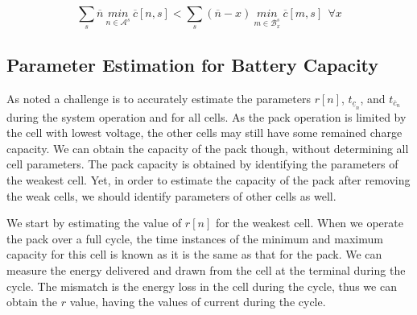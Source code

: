 \documentclass[10pt,twocolumn]{IEEEtran}
\begin{document}
\begin{equation}
\sum_{s} \overline{n} \  \underset{n\in \mathcal{A}^s}{min} \ \overline c[n,s] <  \sum_{s}(\overline{n}-x) \ \underset{m\in \mathcal{B}^{s}_x}{min} \ \overline c[m,s] \ \  \forall x
\label{eq:removecellineq}
\end{equation}

\subsection{Parameter Estimation for Battery Capacity} \label{sec:parameter_estimation}

As noted a challenge is to accurately estimate the parameters  $r[n]$, $t_{\underline{c}_n} $,  and $t_{\overline{c}_n} $  during the system operation and for all cells.%
 As the pack operation is limited by the cell with lowest voltage, the other cells may still have some remained charge capacity.%
We can obtain the capacity of the pack though, without determining all cell parameters. 
The pack capacity is obtained by identifying the parameters of the weakest cell.
Yet, in order to estimate the capacity of the pack after removing the weak cells, we should identify parameters of other cells as well.

We start by estimating the value of $r[n]$ for the weakest cell. 
When we operate the pack over a full cycle, the time instances of the  minimum and maximum capacity for this cell is known as it is the same as that for the pack.
We can  measure the energy delivered and drawn from the cell at the terminal during the cycle.
The mismatch is the energy loss in the cell during the cycle, thus we can obtain the $r$ value, having the values of current during the cycle.
\end{document}
